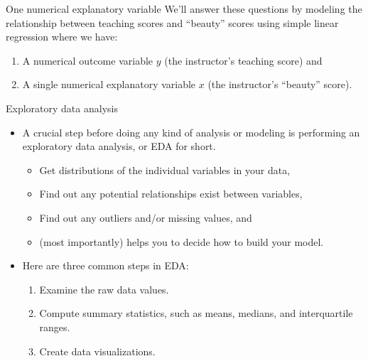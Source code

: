 \documentclass[
  ignorenonframetext,
]{beamer}
\providecommand{\tightlist}{%
  \setlength{\itemsep}{0pt}\setlength{\parskip}{0pt}}
\begin{document}
\begin{frame}{One numerical explanatory variable}
\protect\hypertarget{one-numerical-explanatory-variable-2}{}
We'll answer these questions by modeling the relationship between
teaching scores and ``beauty'' scores using simple linear regression
where we have:

\begin{enumerate}
\item
  A numerical outcome variable \(y\) (the instructor's teaching score)
  and
\item
  A single numerical explanatory variable \(x\) (the instructor's
  ``beauty'' score).
\end{enumerate}
\end{frame}

\begin{frame}{Exploratory data analysis}
\protect\hypertarget{exploratory-data-analysis}{}
\begin{itemize}
\item
  A crucial step before doing any kind of analysis or modeling is
  performing an exploratory data analysis, or EDA for short.

  \begin{itemize}
  \tightlist
  \item
    Get distributions of the individual variables in your data,
  \item
    Find out any potential relationships exist between variables,
  \item
    Find out any outliers and/or missing values, and
  \item
    (most importantly) helps you to decide how to build your model.
  \end{itemize}
\item
  Here are three common steps in EDA:

  \begin{enumerate}
  \tightlist
  \item
    Examine the raw data values.
  \item
    Compute summary statistics, such as means, medians, and
    interquartile ranges.
  \item
    Create data visualizations.
  \end{enumerate}
\end{itemize}
\end{frame}
\end{document}

